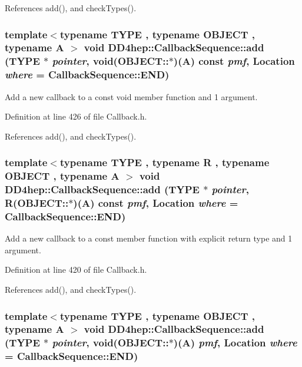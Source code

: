 References add(), and checkTypes().\hypertarget{struct_d_d4hep_1_1_callback_sequence_ac7198c9f6c25ecbbc37d642032d7cf72}{
\subsubsection[{add}]{\setlength{\rightskip}{0pt plus 5cm}template$<$typename TYPE , typename OBJECT , typename A $>$ void DD4hep::CallbackSequence::add (TYPE $\ast$ {\em pointer}, \/  void(OBJECT::$\ast$)(A) const  {\em pmf}, \/  {\bf Location} {\em where} = {\ttfamily CallbackSequence::END})}}
\label{struct_d_d4hep_1_1_callback_sequence_ac7198c9f6c25ecbbc37d642032d7cf72}


Add a new callback to a const void member function and 1 argument. 

Definition at line 426 of file Callback.h.

References add(), and checkTypes().\hypertarget{struct_d_d4hep_1_1_callback_sequence_a1f32b3cb3cfcafe241242a8bbdc55fcf}{
\subsubsection[{add}]{\setlength{\rightskip}{0pt plus 5cm}template$<$typename TYPE , typename R , typename OBJECT , typename A $>$ void DD4hep::CallbackSequence::add (TYPE $\ast$ {\em pointer}, \/  R(OBJECT::$\ast$)(A) const  {\em pmf}, \/  {\bf Location} {\em where} = {\ttfamily CallbackSequence::END})}}
\label{struct_d_d4hep_1_1_callback_sequence_a1f32b3cb3cfcafe241242a8bbdc55fcf}


Add a new callback to a const member function with explicit return type and 1 argument. 

Definition at line 420 of file Callback.h.

References add(), and checkTypes().\hypertarget{struct_d_d4hep_1_1_callback_sequence_a193702d2e926545fcd103cab1fb2d37c}{
\subsubsection[{add}]{\setlength{\rightskip}{0pt plus 5cm}template$<$typename TYPE , typename OBJECT , typename A $>$ void DD4hep::CallbackSequence::add (TYPE $\ast$ {\em pointer}, \/  void(OBJECT::$\ast$)(A) {\em pmf}, \/  {\bf Location} {\em where} = {\ttfamily CallbackSequence::END})}}
\label{struct_d_d4hep_1_1_callback_sequence_a193702d2e926545fcd103cab1fb2d37c}



